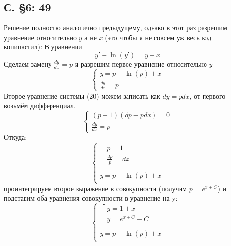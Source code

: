 \documentclass{article}
\begin{document}
\subsection{С. \S6: 49 }
Решение полностю аналогично предыдущему, однако в этот раз разрешим уравнение относительно $y$ а не $x$ (это чтобы я не совсем уж весь код копипастил):
В уравнении 
\begin{equation}
    y'-\ln(y')=y-x 
\end{equation}
Сделаем замену $\frac{d y}{d x}=p$ и разрешим первое уравнение относительно $y$ 
\begin{equation}
    \begin{cases}
        y=p - \ln(p) + x\\
        \frac{d y}{d x}=p
    \end{cases}
\end{equation}
Второе уравнение системы (20) можем записать как $dy = p dx$, от первого возьмём дифференциал.
\begin{equation}
    \begin{cases}
        (p-1)(d p - p d x)=0 \\
        \frac{d y}{d x}=p
    \end{cases}
\end{equation}
Откуда:
\begin{equation}
    \begin{cases}
    \left[
    \begin{gathered}
        p=1\\
        \frac{d p}{p} = dx \\
    \end{gathered}
    \right. \\
        y=p - \ln(p) + x \\
    \end{cases}
\end{equation}
проинтегрируем второе выражение в совокупности (получим $p=e^{x+C}$) и подставим оба уравнения совокупности в уравнение на y:
\begin{equation}
\begin{cases}
\left[
\begin{gathered}
    y=1+x\\
    y=e^{x + C} -C \\
\end{gathered} \right. \\
    y=p - \ln(p) + x \\
\end{cases}
\end{equation}
\end{document}
